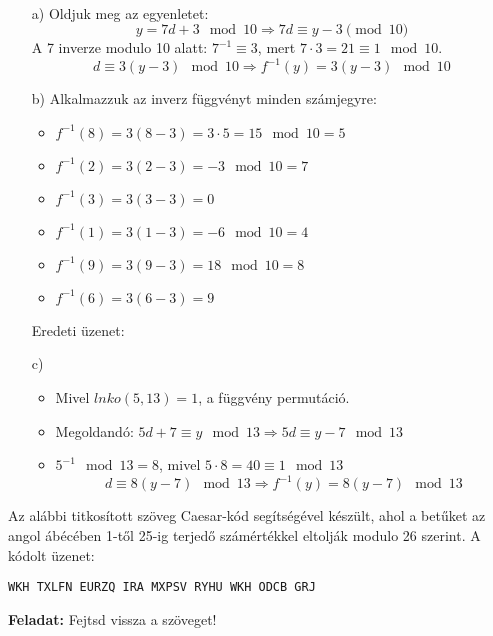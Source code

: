 \begin{solution}
~
\begin{itemize}
\item[a)] Oldjuk meg az egyenletet: 
\[
y=7d+3\mod 10\Rightarrow7d\equiv y-3\pmod{10}
\]
A 7 inverze modulo 10 alatt: $7^{-1}\equiv3$, mert $7\cdot3=21\equiv1\mod 10$.
\[
d\equiv3(y-3)\mod{10}\Rightarrow f^{-1}(y)=3(y-3)\mod{10}
\]
\item[b)] Alkalmazzuk az inverz függvényt minden számjegyre: 
\begin{itemize}
\item $f^{-1}(8)=3(8-3)=3\cdot5=15\mod 10=5$ 
\item $f^{-1}(2)=3(2-3)=-3\mod 10=7$ 
\item $f^{-1}(3)=3(3-3)=0$ 
\item $f^{-1}(1)=3(1-3)=-6\mod 10=4$ 
\item $f^{-1}(9)=3(9-3)=18\mod 10=8$ 
\item $f^{-1}(6)=3(6-3)=9$ 
\end{itemize}
Eredeti üzenet:  
\item[c)] 
\begin{itemize}
\item Mivel $lnko(5,13)=1$, a függvény permutáció. 
\item Megoldandó: $5d+7\equiv y\mod{13}\Rightarrow5d\equiv y-7\mod{13}$ 
\item $5^{-1}\mod{13}=8$, mivel $5\cdot8=40\equiv1\mod{13}$ 
\[
d\equiv8(y-7)\mod{13}\Rightarrow f^{-1}(y)=8(y-7)\mod{13}
\]
\end{itemize}
\end{itemize}
\end{solution}
\begin{extraproblem}
Az alábbi titkosított szöveg Caesar-kód segítségével készült, ahol
a betűket az angol ábécében 1-től 25-ig terjedő számértékkel eltolják
modulo 26 szerint. A kódolt üzenet:
\begin{center}
\texttt{WKH TXLFN EURZQ IRA MXPSV RYHU WKH ODCB GRJ} 
\par\end{center}
\textbf{Feladat:} Fejtsd vissza a szöveget!
\end{extraproblem}

